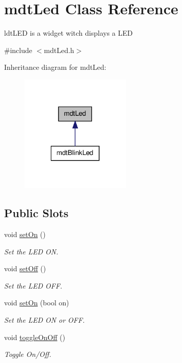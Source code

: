 \hypertarget{classmdt_led}{
\section{mdtLed Class Reference}
\label{classmdt_led}
}


ldtLED is a widget witch displays a LED  




{\ttfamily \#include $<$mdtLed.h$>$}



Inheritance diagram for mdtLed:
\nopagebreak
\begin{figure}[H]
\begin{center}
\leavevmode
\includegraphics[width=150pt]{classmdt_led__inherit__graph}
\end{center}
\end{figure}
\subsection*{Public Slots}
\begin{DoxyCompactItemize}
\item 
\hypertarget{classmdt_led_a389ee3e0082ce8fa38cb258944a04892}{
void \hyperlink{classmdt_led_a389ee3e0082ce8fa38cb258944a04892}{setOn} ()}
\label{classmdt_led_a389ee3e0082ce8fa38cb258944a04892}

\begin{DoxyCompactList}\small\item\em Set the LED ON. \end{DoxyCompactList}\item 
\hypertarget{classmdt_led_a4c8f5f6aa91b7c90ae6b1aa4933ba6e0}{
void \hyperlink{classmdt_led_a4c8f5f6aa91b7c90ae6b1aa4933ba6e0}{setOff} ()}
\label{classmdt_led_a4c8f5f6aa91b7c90ae6b1aa4933ba6e0}

\begin{DoxyCompactList}\small\item\em Set the LED OFF. \end{DoxyCompactList}\item 
void \hyperlink{classmdt_led_aabbe7fcb23d539946dffec4526c89495}{setOn} (bool on)
\begin{DoxyCompactList}\small\item\em Set the LED ON or OFF. \end{DoxyCompactList}\item 
void \hyperlink{classmdt_led_a9e86ff65f2ec1bfb6131e2b9042609e8}{toggleOnOff} ()
\begin{DoxyCompactList}\small\item\em Toggle On/Off. \end{DoxyCompactList}\end{DoxyCompactItemize}
